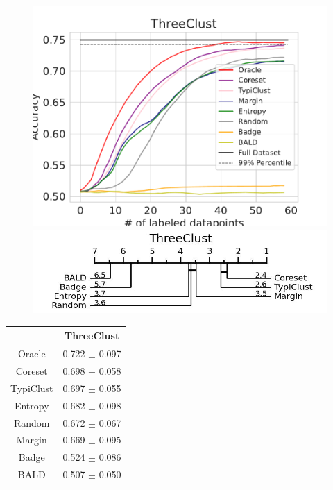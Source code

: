 \documentclass[]{article}
\begin{document}
\begin{minipage}{0.65\linewidth}
\begin{figure}[H]
    \centering
\includegraphics[width=\linewidth]{img/eval_threeclust.pdf} \\[2mm]
\includegraphics[width=\linewidth]{img/micro_threeclust.jpg}
\end{figure}
\end{minipage}
\begin{minipage}{0.29\linewidth}
\begin{tabular}{c|c}
&ThreeClust \\
\hline
Oracle&0.722 $\pm$ 0.097\\
Coreset&0.698 $\pm$ 0.058\\
TypiClust&0.697 $\pm$ 0.055\\
Entropy&0.682 $\pm$ 0.098\\
Random&0.672 $\pm$ 0.067\\
Margin&0.669 $\pm$ 0.095\\
Badge&0.524 $\pm$ 0.086\\
BALD&0.507 $\pm$ 0.050\\
\end{tabular}
\end{minipage}
\end{document}
